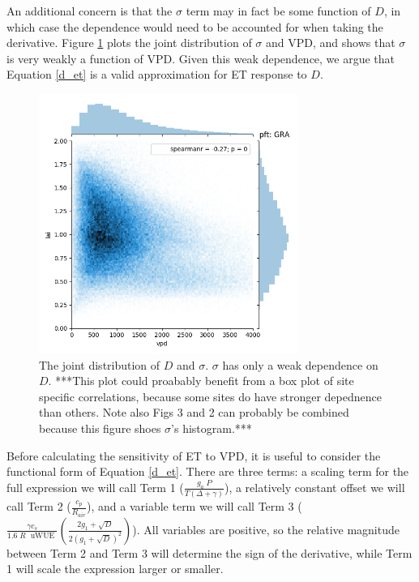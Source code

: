 \documentclass[draft,linenumbers]{agujournal}
\begin{document}
An additional concern is that the $\sigma$ term may in fact be some function of $D$, in which case the dependence would need to be accounted for when taking the derivative. Figure \ref{lai_vpd_fig} plots the joint distribution of $\sigma$ and VPD, and shows that $\sigma$ is very weakly a function of VPD. Given this weak dependence, we argue that Equation \ref{d_et} is a valid approximation for ET response to $D$.

\begin{figure}[h]
\centering
\includegraphics[width=20pc]{./fig03.png}
\caption{The joint distribution of $D$ and $\sigma$. $\sigma$ has only a weak dependence on $D$. ***This plot could proabably benefit from a box plot of site specific correlations, because some sites do have stronger depednence than others. Note also Figs 3 and 2 can probably be combined because this figure shoes $\sigma$'s histogram.***}
\label{lai_vpd_fig}
\end{figure}


Before calculating the sensitivity of ET to VPD, it is useful to consider the functional form of Equation \ref{d_et}. There are three terms: a scaling term for the full expression we will call Term 1 ($\frac{g_a \; P}{T(\Delta + \gamma)}$), a relatively constant offset we will call Term 2 ($\frac{c_p}{R_{air}}$), and a variable term we will call Term 3 ($\frac{\gamma c_s }{1.6 \; R\; \text{ uWUE }} \left( \frac{2 g_1 + \sqrt{D}}{2 (g_1 + \sqrt{D})^2}\right)$). All variables are positive, so the relative magnitude between Term 2 and Term 3 will determine the sign of the derivative, while Term 1 will scale the expression larger or smaller.
\end{document}
